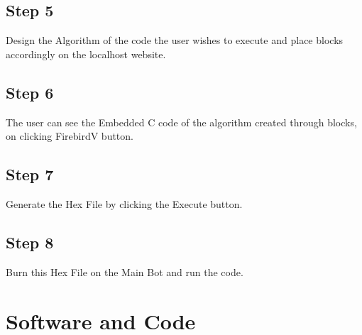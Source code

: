 \documentclass[a4paper,12pt,oneside]{book}
\begin{document}
\subsection*{Step 5}
Design the Algorithm of the code the user wishes to execute and place blocks accordingly on the localhost website. 
\subsection*{Step 6}
The user can see the Embedded C code of the algorithm created through blocks, on clicking FirebirdV button.
\subsection*{Step 7}
Generate the Hex File by clicking the Execute button.
\subsection*{Step 8}
Burn this Hex File on the Main Bot and run the code.


\section{Software and Code}
\end{document}
